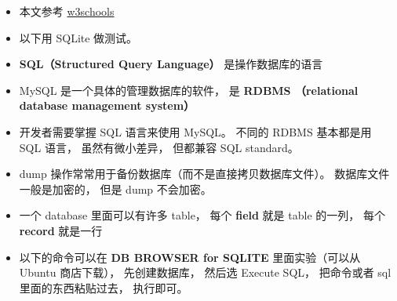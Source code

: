 
\begin{issues}
\issueDraft
\end{issues}

\begin{itemize}
\item 本文参考 \href{https://www.w3schools.com/sql/default.asp}{w3schools}
\item 以下用 SQLite 做测试。
\item \textbf{SQL（Structured Query Language）} 是操作数据库的语言
\item MySQL 是一个具体的管理数据库的软件， 是 \textbf{RDBMS （relational database management system）}
\item 开发者需要掌握 SQL 语言来使用 MySQL。 不同的 RDBMS 基本都是用 SQL 语言， 虽然有微小差异， 但都兼容 SQL standard。
\item dump 操作常常用于备份数据库（而不是直接拷贝数据库文件）。 数据库文件一般是加密的， 但是 dump 不会加密。
\item 一个 database 里面可以有许多 table， 每个 \textbf{field} 就是 table 的一列， 每个 \textbf{record} 就是一行
\item 以下的命令可以在 \textbf{DB BROWSER for SQLITE} 里面实验（可以从 Ubuntu 商店下载）， 先创建数据库， 然后选 Execute SQL， 把命令或者 sql 里面的东西粘贴过去， 执行即可。
\end{itemize}

